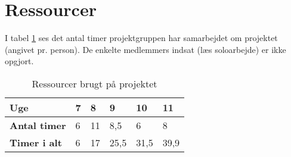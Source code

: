 \section{Ressourcer}
I tabel \ref{table:ressourcer} ses det antal timer projektgruppen har samarbejdet om projektet (angivet pr. person). De enkelte medlemmers indsat (læs soloarbejde) er ikke opgjort.\\

\begin{table}[h]
    \centering
    \begin{tabular}{|p{3cm}|p{1cm}|p{1cm}|p{1cm}|p{1cm}|p{1cm}|} 
        \hline
        \textbf{Uge}         & \textbf{7} & \textbf{8} & \textbf{9} & \textbf{10} & \textbf{11}  \\ 
        \hline
        \textbf{Antal timer} & 6          & 11         & 8,5        & 6           & 8            \\ 
        \hline
        \textbf{Timer i alt} & 6          & 17         & 25,5       & 31,5        & 39,9         \\
        \hline
    \end{tabular}
    \caption{Ressourcer brugt på projektet}
    \label{table:ressourcer}
\end{table}
